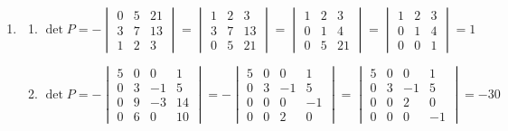 \documentclass[12pt,a4paper]{article}
\begin{document}
\begin{enumerate}
\item \begin{enumerate}
\item
$\det{P} =
-
\begin{vmatrix}
0 & 5 & 21\\
3 & 7 & 13\\
1 & 2 &  3 
\end{vmatrix}
=
\begin{vmatrix}
1 & 2 &  3\\ 
3 & 7 & 13\\
0 & 5 & 21
\end{vmatrix}
=
\begin{vmatrix}
1 & 2 &  3\\ 
0 & 1 &  4\\
0 & 5 & 21
\end{vmatrix}
=
\begin{vmatrix}
1 & 2 & 3\\ 
0 & 1 & 4\\
0 & 0 & 1
\end{vmatrix}
= 1$

\item
$\det{P}
=
-
\begin{vmatrix}
5 & 0 & 0 & 1\\
0 & 3 & -1 & 5\\
0 & 9 & -3 & 14\\
0 & 6 & 0 & 10
\end{vmatrix}
=
-
\begin{vmatrix}
5 & 0 & 0 & 1\\
0 & 3 & -1 & 5\\
0 & 0 & 0 & -1\\
0 & 0 & 2 & 0
\end{vmatrix}
=
\begin{vmatrix}
5 & 0 & 0 & 1\\
0 & 3 & -1 & 5\\
0 & 0 & 2 & 0\\
0 & 0 & 0 & -1
\end{vmatrix}
= -30$


\end{enumerate}
\end{enumerate}
\end{document}
